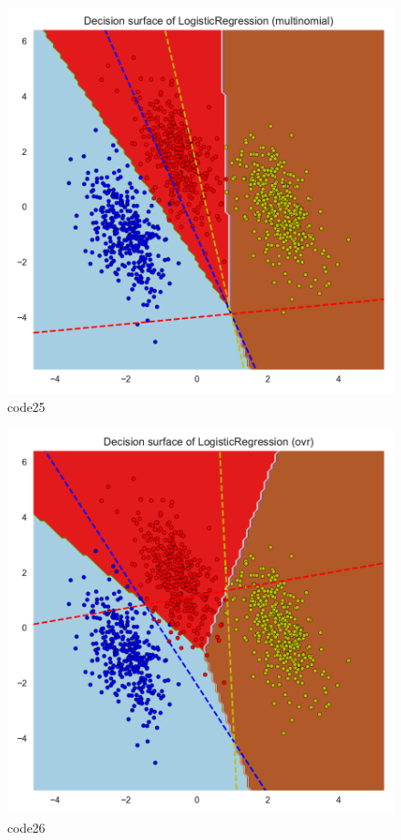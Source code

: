 \begin{figure}[htbp]
	\centering
	\includegraphics[width=14cm]{codeimage/code25}
	\caption{code25}
	\label{code25}
\end{figure}

\begin{figure}[htbp]
	\centering
	\includegraphics[width=14cm]{codeimage/code26}
	\caption{code26}
	\label{code26}
\end{figure}

